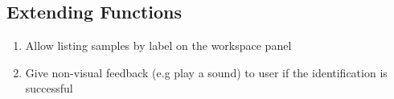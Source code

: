 
\subsection{Extending Functions}
\begin{enumerate}[resume*]
    \item Allow listing samples by label on the workspace panel
    \item Give non-visual feedback (e.g play a sound) to user if the identification is successful
\end{enumerate}